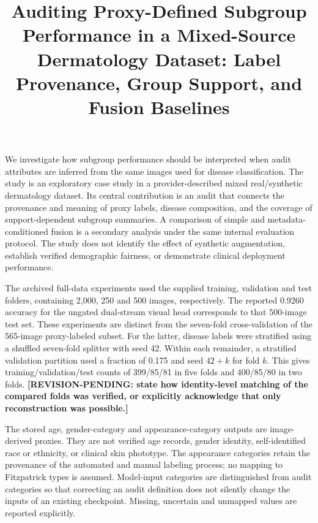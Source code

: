 
\title[Proxy-Defined Dermatology Audit]{Auditing Proxy-Defined Subgroup Performance in a Mixed-Source Dermatology Dataset: Label Provenance, Group Support, and Fusion Baselines}

We investigate how subgroup performance should be interpreted when audit
attributes are inferred from the same images used for disease classification.
The study is an exploratory case study in a provider-described mixed
real/synthetic dermatology dataset. Its central contribution is an audit that
connects the provenance and meaning of proxy labels, disease composition, and
the coverage of support-dependent subgroup summaries. A comparison of simple
and metadata-conditioned fusion is a secondary analysis under the same internal
evaluation protocol. The study does not identify the effect of synthetic
augmentation, establish verified demographic fairness, or demonstrate clinical
deployment performance.

The archived full-data experiments used the supplied training, validation and
test folders, containing 2,000, 250 and 500 images, respectively. The reported
0.9260 accuracy for the ungated dual-stream visual head corresponds to that
500-image test set. These experiments are distinct from the seven-fold
cross-validation of the 565-image proxy-labeled subset. For the latter, disease
labels were stratified using a shuffled seven-fold splitter with seed 42.
Within each remainder, a stratified validation partition used a fraction of
0.175 and seed $42+k$ for fold $k$. This gives training/validation/test counts
of 399/85/81 in five folds and 400/85/80 in two folds.
\textbf{[REVISION-PENDING: state how identity-level matching of the compared
folds was verified, or explicitly acknowledge that only reconstruction was
possible.]}

The stored age, gender-category and appearance-category outputs are
image-derived proxies. They are not verified age records, gender identity,
self-identified race or ethnicity, or clinical skin phototype. The appearance
categories retain the provenance of the automated and manual labeling process;
no mapping to Fitzpatrick types is assumed. Model-input categories are
distinguished from audit categories so that correcting an audit definition does
not silently change the inputs of an existing checkpoint. Missing, uncertain
and unmapped values are reported explicitly.

